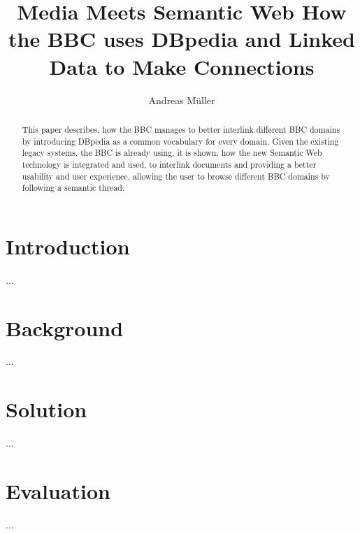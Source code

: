 \documentclass{llncs}
\begin{document}
%
\frontmatter          %
%
\pagestyle{headings}  %
%
\mainmatter              %
%
\title{Media Meets Semantic Web \newline How the BBC uses DBpedia and Linked Data \newline to Make Connections}
%
%
\author{Andreas M\"{u}ller}
%
%
%

\maketitle              %

\begin{abstract} %
This paper describes, how the BBC manages to better interlink different BBC domains by introducing DBpedia as a common vocabulary for every domain. Given the existing legacy systems, the BBC is already using, it is shown, how the new Semantic Web technology is integrated and used, to interlink documents and providing a better usability and user experience, allowing the user to browse different BBC domains by following a semantic thread.
\end{abstract}
%
\section{Introduction}
%
...
%
\section{Background}
%
...
%
\section{Solution}
%
...
%
\section{Evaluation}
%
...
%
\end{document}

